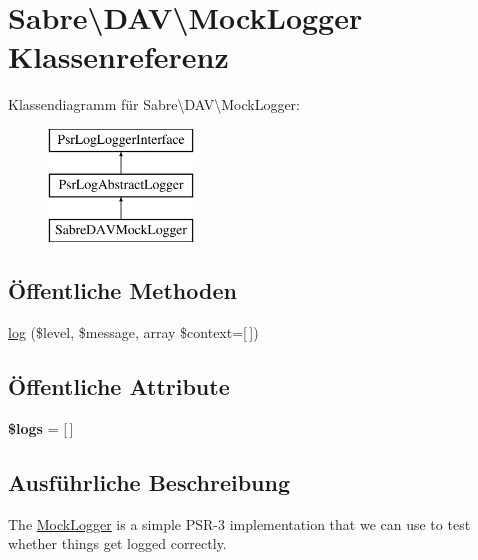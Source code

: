\hypertarget{class_sabre_1_1_d_a_v_1_1_mock_logger}{}\section{Sabre\textbackslash{}D\+AV\textbackslash{}Mock\+Logger Klassenreferenz}
\label{class_sabre_1_1_d_a_v_1_1_mock_logger}
Klassendiagramm für Sabre\textbackslash{}D\+AV\textbackslash{}Mock\+Logger\+:\begin{figure}[H]
\begin{center}
\leavevmode
\includegraphics[height=3.000000cm]{class_sabre_1_1_d_a_v_1_1_mock_logger}
\end{center}
\end{figure}
\subsection*{Öffentliche Methoden}
\begin{DoxyCompactItemize}
\item 
\mbox{\hyperlink{class_sabre_1_1_d_a_v_1_1_mock_logger_a95d49687f40a08248f4f445c652b5733}{log}} (\$level, \$message, array \$context=\mbox{[}$\,$\mbox{]})
\end{DoxyCompactItemize}
\subsection*{Öffentliche Attribute}
\begin{DoxyCompactItemize}
\item 
\mbox{\label{class_sabre_1_1_d_a_v_1_1_mock_logger_aeea6bc178bfc9c9ac8b6c3146f9ab52d}} 
{\bfseries \$logs} = \mbox{[}$\,$\mbox{]}
\end{DoxyCompactItemize}


\subsection{Ausführliche Beschreibung}
The \mbox{\hyperlink{class_sabre_1_1_d_a_v_1_1_mock_logger}{Mock\+Logger}} is a simple P\+S\+R-\/3 implementation that we can use to test whether things get logged correctly.

